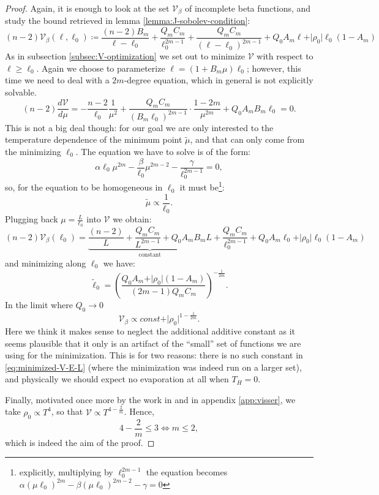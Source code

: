 \begin{proof}
	Again, it is enough to look at the set \(\mathcal{V}_{\beta}\) of incomplete beta functions, and study the bound retrieved in lemma \ref{lemma:J-sobolev-condition}:
	\[
	(n - 2)\mathcal{V}_{\beta}(\ell, \ell_0) \coloneqq \frac{(n - 2) B_m}{\ell - \ell_0} + \frac{Q_mC_m}{\ell_0^{2m - 1}} + \frac{Q_mC_m}{(\ell - \ell_0)^{2m - 1}}	+ Q_0A_m\ell + \vert\rho_0\vert\ell_0(1 - A_m)
	\]
	As in subsection \ref{subsec:V-optimization} we set out to minimize \(\mathcal{V}\) with respect to \(\ell \ge \ell_0\). Again we choose to parameterize \(\ell = (1 + B_m\mu)\ell_0\); however, this time we need to deal with a \(2m\)-degree equation, which in general is not explicitly solvable.
	\[
		(n - 2)\frac{d\mathcal{V}}{d\mu} = -\frac{n - 2}{\ell_0} \frac{1}{\mu^2} + \frac{Q_mC_m}{(B_m \ell_0)^{2m - 1}} \cdot \frac{1 - 2m}{\mu^{2m}} + Q_0A_mB_m\ell_0 = 0.
	\]
	This is not a big deal though: for our goal we are only interested to the temperature dependence of the minimum point \(\tilde{\mu}\), and that can only come from the minimizing \(\ell_0\). The equation we have to solve is of the form:
	\[
	\alpha \ell_0 \mu^{2m} - \frac{\beta}{\ell_0}\mu^{2m - 2} - \frac{\gamma}{\ell_0^{2m - 1}} = 0,
	\]
	so, for the equation to be homogeneous in \(\ell_0\) it must be\footnote{explicitly, multiplying by \(\ell_0^{2m - 1}\) the equation becomes \(\alpha(\mu\ell_0)^{2m} - \beta(\mu\ell_0)^{2m -2} - \gamma = 0\)}:
	\[
	\tilde{\mu} \propto \frac{1}{\ell_0}.
	\]
	Plugging back \(\mu = \frac{L}{\ell_0}\) into \(\mathcal{V}\) we obtain:
	\[
		(n - 2)\mathcal{V}_{\beta}(\ell_0) = \underbrace{\frac{(n - 2)}{L} + \frac{Q_mC_m}{L^{2m - 1}} + Q_0A_mB_mL}_{\text{constant}} + \frac{Q_mC_m}{\ell_0^{2m - 1}} + Q_0A_m\ell_0 + \vert\rho_0\vert\ell_0(1 - A_m)	
	\]
	and minimizing along \(\ell_0\) we have:
	\begin{equation}
		\label{eq:state-indipendent-minimal-l0}
		\tilde{\ell}_0	= \left(\frac{Q_0 A_m + \vert\rho_0\vert (1 - A_m)}{(2m - 1)Q_mC_m}\right)^{-\frac{1}{2m}}.
	\end{equation}
	In the limit where \(Q_0 \rightarrow 0\)
	\[
		\mathcal{V}_{\beta} \propto const + \vert \rho_0\vert^{1 - \frac{1}{2m}}.
	\]
	Here we think it makes sense to neglect the additional additive constant as it seems plausible that it only is an artifact of the ``small'' set of functions we are using for the minimization. This is for two reasons: there is no such constant in \eqref{eq:minimized-V-E-L} (where the minimization was indeed run on a larger set), and physically we should expect no evaporation at all when \(T_H = 0\).

	Finally, motivated once more by the work in \cite{levi2016versatile} and in appendix \ref{app:visser}, we take \(\rho_0 \propto T^4\), so that \(\mathcal{V} \propto T^{4 - \frac{2}{m}}\). 
	Hence, 
	\[
		4 - \frac{2}{m} \le 3 \iff m \le 2,	
	\]
	which is indeed the aim of the proof.
\end{proof}
